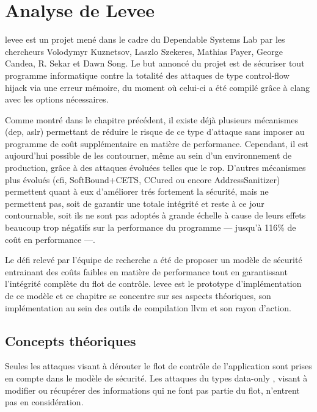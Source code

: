 \chapter{Analyse de Levee}
\label{chap:levee}


\gls{levee} est un projet mené dans le cadre du Dependable Systems Lab \cite{dslab} par les chercheurs Volodymyr Kuznetsov, Laszlo Szekeres, Mathias Payer, George Candea, R. Sekar et Dawn Song. Le but annoncé du projet est de sécuriser tout programme informatique contre la totalité des attaques de type \og control-flow hijack \fg via une erreur mémoire, du moment où celui-ci a été compilé grâce à \gls{clang} avec les options nécessaires.

Comme montré dans le chapitre précédent, il existe déjà plusieurs mécanismes (\gls{dep}, \gls{aslr}) permettant de réduire le risque de ce type d'attaque sans imposer au programme de coût supplémentaire en matière de performance. Cependant, il est aujourd'hui possible de les contourner, même au sein d'un environnement de production, grâce à des attaques évoluées telles que le \gls{rop}. D'autres mécanismes plus évolués (\gls{cfi}, SoftBound+CETS, CCured ou encore AddressSanitizer) permettent quant à eux d'améliorer trés fortement la sécurité, mais ne permettent pas, soit de garantir une totale intégrité et reste à ce jour contournable, soit ils ne sont pas adoptés à grande échelle à cause de leurs effets beaucoup trop négatifs sur la performance du programme --- jusqu'à 116\% de coût en performance ---.

Le défi relevé par l'équipe de recherche a été de proposer un modèle de sécurité entrainant des coûts faibles en matière de performance tout en garantissant l'intégrité complète du flot de contrôle. \gls{levee} est le prototype d'implémentation de ce modèle et ce chapitre se concentre sur ses aspects théoriques, son implémentation au sein des outils de compilation \gls{llvm} et son rayon d'action.

\minitoc

\newpage

\section{Concepts théoriques}

Seules les attaques visant à dérouter le flot de contrôle de l'application sont prises en compte dans le modèle de sécurité. Les attaques du types \og data-only \fg, visant à modifier ou récupérer des informations qui ne font pas partie du flot, n'entrent pas en considération.

